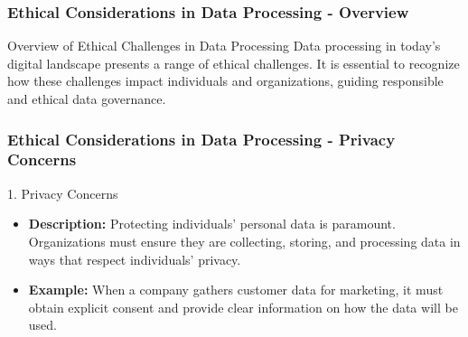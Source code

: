 \documentclass{beamer}
\begin{document}
\begin{frame}[fragile]
    \frametitle{Ethical Considerations in Data Processing - Overview}
    \begin{block}{Overview of Ethical Challenges in Data Processing}
        Data processing in today's digital landscape presents a range of ethical challenges. It is essential to recognize how these challenges impact individuals and organizations, guiding responsible and ethical data governance.
    \end{block}
\end{frame}

\begin{frame}[fragile]
    \frametitle{Ethical Considerations in Data Processing - Privacy Concerns}
    \begin{block}{1. Privacy Concerns}
        \begin{itemize}
            \item \textbf{Description:} Protecting individuals' personal data is paramount. Organizations must ensure they are collecting, storing, and processing data in ways that respect individuals' privacy.
            \item \textbf{Example:} When a company gathers customer data for marketing, it must obtain explicit consent and provide clear information on how the data will be used.
        \end{itemize}
    \end{block}
\end{frame}
\end{document}
